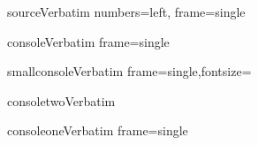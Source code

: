 

\DefineVerbatimEnvironment%
 {source}{Verbatim}
 {numbers=left,
 frame=single}

\newcommand\includesource[1] {
\VerbatimInput[frame=single, numbers=left]
{#1}
}
\newcommand\includesourcenonumbers[1] {
\VerbatimInput[frame=single]
{#1}
}

\newcommand\includesourcenonumberslabel[1] {
\VerbatimInput[frame=single]
{#1}\vspace{-0.5cm}\begin{center}{{\scriptsize \texttt{#1}}}\end{center}}

\DefineVerbatimEnvironment%
 {console}{Verbatim}
 {frame=single}

\DefineVerbatimEnvironment%
 {smallconsole}{Verbatim}
 {frame=single,fontsize=\small}

\DefineVerbatimEnvironment%
 {consoletwo}{Verbatim}
 {}

\DefineVerbatimEnvironment%
 {consoleone}{Verbatim}
 {frame=single}

\usepackage{atbeginend}


